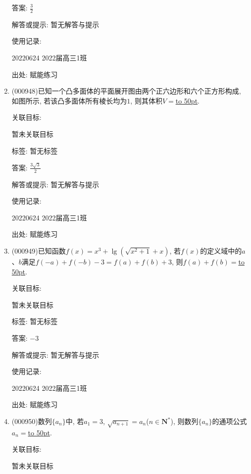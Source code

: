 \documentclass[10pt,a4paper]{article}
\newcommand{\blank}[1]{\underline{\hbox to #1pt{}}}
\begin{document}
\begin{enumerate}[1.]
答案: $\frac 32$

解答或提示: 暂无解答与提示

使用记录:

20220624	2022届高三1班	


出处: 赋能练习
\item { (000948)}已知一个凸多面体的平面展开图由两个正六边形和六个正方形构成, 如图所示, 若该凸多面体所有棱长均为$1$, 则其体积$V=$\blank{50}.
\begin{center}
\end{center}


关联目标:

暂未关联目标



标签: 暂无标签

答案: $\frac{3\sqrt 3}2$

解答或提示: 暂无解答与提示

使用记录:

20220624	2022届高三1班	


出处: 赋能练习
\item { (000949)}已知函数$f(x)={x^3}+\lg (\sqrt{x^2+1}+x)$, 若$f(x)$的定义域中的$a$、$b$满足$f(-a)+f(-b)-3=f(a)+f(b)+3$, 则$f(a)+f(b)=$\blank{50}.


关联目标:

暂未关联目标



标签: 暂无标签

答案: $-3$

解答或提示: 暂无解答与提示

使用记录:

20220624	2022届高三1班	


出处: 赋能练习
\item { (000950)}数列$\{a_n\}$中, 若$a_1=3$, $\sqrt{a_{n+1}}=a_n$($n\in \mathbf{N}^*$), 则数列$\{a_n\}$的通项公式$a_n=$\blank{50}.


关联目标:

暂未关联目标




\end{enumerate}
\end{document}
